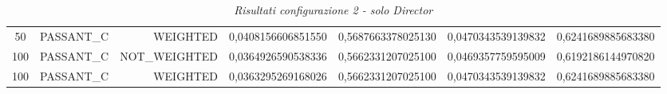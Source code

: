 \begin{table}[H]
{\begin{tabular}{ c l r c c c c }
				50 &  PASSANT\_C &   WEIGHTED & 0,0408156606851550 & 0,5687663378025130 & 0,0470343539139832 & 0,6241689885683380 \\
				
				100 &  PASSANT\_C & NOT\_WEIGHTED & 0,0364926590538336 & 0,5662331207025100 & 0,0469357759595009 & 0,6192186144970820 \\
				
				100 &  PASSANT\_C &   WEIGHTED & 0,0363295269168026 & 0,5662331207025100 & 0,0470343539139832 & 0,6241689885683380 \\			
			\bottomrule
		\end{tabular}  
	}
	\caption{\emph{Risultati configurazione 2 - solo Director}}
\end{table}

\setlength{\tabcolsep}{12pt}
